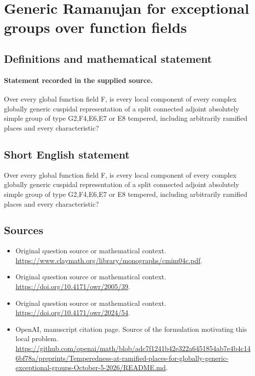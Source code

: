 \documentclass[11pt]{article}
\begin{document}
\section*{Generic Ramanujan for exceptional groups over function fields}\label{30007259}
\subsection{Definitions and mathematical statement}
\paragraph{Statement recorded in the supplied source.}
Over every global function field F, is every local component of every complex globally generic cuspidal representation of a split connected adjoint absolutely simple group of type G2,F4,E6,E7 or E8 tempered, including arbitrarily ramified places and every characteristic?
\subsection{Short English statement}
Over every global function field F, is every local component of every complex globally generic cuspidal representation of a split connected adjoint absolutely simple group of type G2,F4,E6,E7 or E8 tempered, including arbitrarily ramified places and every characteristic?
\subsection{Sources}
\begin{itemize}
\item[S1] Original question source or mathematical context.
\url{https://www.claymath.org/library/monographs/cmim04c.pdf}.
\item[S2] Original question source or mathematical context.
\url{https://doi.org/10.4171/owr/2005/39}.
\item[S3] Original question source or mathematical context.
\url{https://doi.org/10.4171/owr/2024/54}.
\item[S4] OpenAI, manuscript citation page. Source of the formulation motivating this local problem.
\url{https://github.com/openai/math/blob/adc7f1241b42e322a6451854ab7e4b4c146bf78a/preprints/Temperedness-at-ramified-places-for-globally-generic-exceptional-groups-October-5-2026/README.md}.
\end{itemize}
\end{document}
